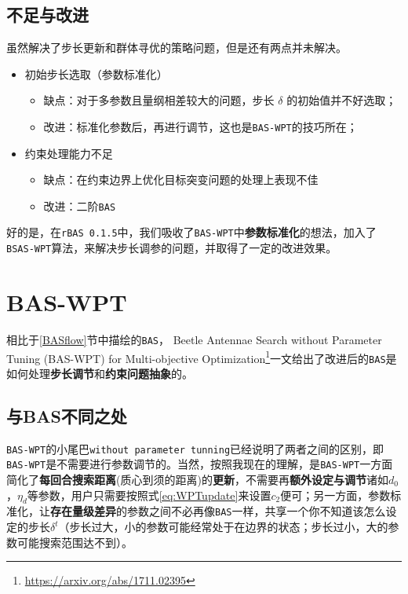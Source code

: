 \documentclass[]{ctexbook}
\providecommand{\tightlist}{%
  \setlength{\itemsep}{0pt}\setlength{\parskip}{0pt}}
\renewcommand{\href}[2]{#2\footnote{\url{#1}}}
\theoremstyle{definition}
\theoremstyle{definition}
\theoremstyle{definition}
\theoremstyle{remark}
\begin{document}
\subsection{不足与改进}\label{BSASimprove}

虽然解决了步长更新和群体寻优的策略问题，但是还有两点并未解决。

\begin{itemize}
\tightlist
\item
  初始步长选取（参数标准化）

  \begin{itemize}
  \tightlist
  \item
    缺点：对于多参数且量纲相差较大的问题，步长 \(\delta\)
    的初始值并不好选取；
  \item
    改进：标准化参数后，再进行调节，这也是\texttt{BAS-WPT}的技巧所在；
  \end{itemize}
\item
  约束处理能力不足

  \begin{itemize}
  \tightlist
  \item
    缺点：在约束边界上优化目标突变问题的处理上表现不佳
  \item
    改进：二阶\texttt{BAS}
  \end{itemize}
\end{itemize}

好的是，在\texttt{rBAS\ 0.1.5}中，我们吸收了\texttt{BAS-WPT}中\textbf{参数标准化}的想法，加入了\texttt{BSAS-WPT}算法，来解决步长调参的问题，并取得了一定的改进效果。

\section{BAS-WPT}\label{bas-wpt}

相比于\ref{BASflow}节中描绘的\texttt{BAS}，
\href{https://arxiv.org/abs/1711.02395}{Beetle Antennae Search without
Parameter Tuning (BAS-WPT) for Multi-objective
Optimization}一文给出了改进后的\texttt{BAS}是如何处理\textbf{步长调节}和\textbf{约束问题抽象}的。

\subsection{与BAS不同之处}\label{BASWPTflow}

\texttt{BAS-WPT}的小尾巴\texttt{without\ parameter\ tunning}已经说明了两者之间的区别，即\texttt{BAS-WPT}是不需要进行参数调节的。当然，按照我现在的理解，是\texttt{BAS-WPT}一方面简化了\textbf{每回合搜索距离}(质心到须的距离)的\textbf{更新}，不需要再\textbf{额外设定与调节}诸如\(d_0\)，\(\eta_d\)等参数，用户只需要按照式\eqref{eq:WPTupdate}来设置\(c_2\)便可；另一方面，参数标准化，让\textbf{存在量级差异}的参数之间不必再像\texttt{BAS}一样，共享一个你不知道该怎么设定的步长\(\delta^t\)（步长过大，小的参数可能经常处于在边界的状态；步长过小，大的参数可能搜索范围达不到）。
\end{document}
